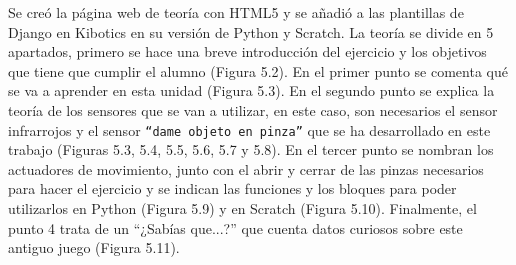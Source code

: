 Se creó la página web de teoría con HTML5  y se añadió a las plantillas de Django en Kibotics en su versión de Python y Scratch. La teoría se divide en 5 apartados, primero se hace una breve introducción del ejercicio y los objetivos que tiene que cumplir el alumno (Figura 5.2). En el primer punto se comenta qué se va a aprender en esta unidad (Figura 5.3). En el segundo punto se explica la teoría de los sensores que se van a utilizar, en este caso, son necesarios el sensor infrarrojos y el sensor \texttt{``dame objeto en pinza''} que se ha desarrollado en este trabajo (Figuras 5.3, 5.4, 5.5, 5.6, 5.7 y 5.8). En el tercer punto se nombran los actuadores de movimiento, junto con  el abrir y cerrar de las pinzas necesarios para hacer el ejercicio y se indican las funciones y los bloques para poder utilizarlos en Python (Figura 5.9) y en Scratch (Figura 5.10). Finalmente, el punto 4 trata de un ``¿Sabías que...?''  que cuenta datos curiosos sobre este antiguo juego (Figura 5.11).


